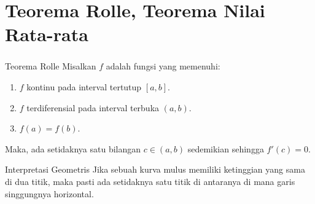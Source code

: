 \documentclass{../../kalkulus-ppt}
\begin{document}
\section{Teorema Rolle, Teorema Nilai Rata-rata}
\begin{frame}
  \frametitle{\insertsection}
  \begin{teorema}{Teorema Rolle}
    Misalkan $f$ adalah fungsi yang memenuhi:
    \begin{enumerate}
      \item $f$ kontinu pada interval tertutup $[a,b]$.
      \item $f$ terdiferensial pada interval terbuka $(a,b)$.
      \item $f(a) = f(b)$.
    \end{enumerate}
    Maka, ada setidaknya satu bilangan $c \in (a,b)$ sedemikian sehingga $f'(c) = 0$.
  \end{teorema}
  \pause
  \begin{block}{Interpretasi Geometris}
    Jika sebuah kurva mulus memiliki ketinggian yang sama di dua titik, maka pasti ada setidaknya satu titik di antaranya di mana garis singgungnya horizontal.
  \end{block}
  \begin{center}
  \end{center}
\end{frame}
\end{document}
